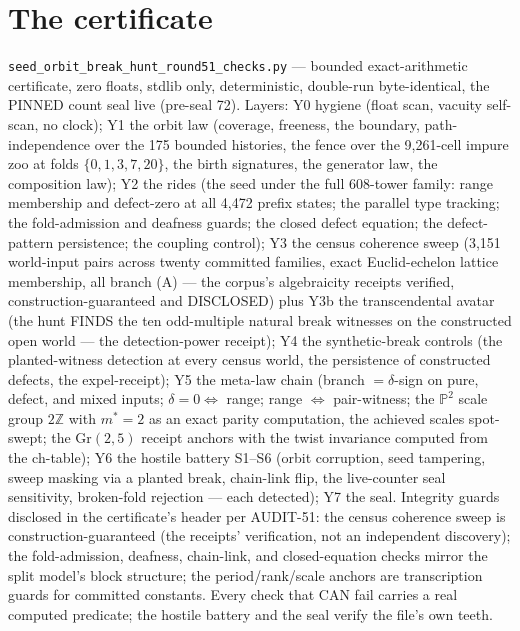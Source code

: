 \documentclass[11pt]{article}
\begin{document}
\section*{The certificate}

\texttt{seed\_orbit\_break\_hunt\_round51\_checks.py} --- bounded exact-arithmetic certificate, zero floats, stdlib only, deterministic, double-run byte-identical, the PINNED count seal live (pre-seal 72). Layers: Y0 hygiene (float scan, vacuity self-scan, no clock); Y1 the orbit law (coverage, freeness, the boundary, path-independence over the 175 bounded histories, the fence over the 9{,}261-cell impure zoo at folds $\{0,1,3,7,20\}$, the birth signatures, the generator law, the composition law); Y2 the rides (the seed under the full 608-tower family: range membership and defect-zero at all 4{,}472 prefix states; the parallel type tracking; the fold-admission and deafness guards; the closed defect equation; the defect-pattern persistence; the coupling control); Y3 the census coherence sweep (3{,}151 world-input pairs across twenty committed families, exact Euclid-echelon lattice membership, all branch (A) --- the corpus's algebraicity receipts verified, construction-guaranteed and DISCLOSED) plus Y3b the transcendental avatar (the hunt FINDS the ten odd-multiple natural break witnesses on the constructed open world --- the detection-power receipt); Y4 the synthetic-break controls (the planted-witness detection at every census world, the persistence of constructed defects, the expel-receipt); Y5 the meta-law chain (branch $=\delta$-sign on pure, defect, and mixed inputs; $\delta=0\iff$ range; range $\iff$ pair-witness; the $\mathbb P^2$ scale group $2\mathbb Z$ with $m^*=2$ as an exact parity computation, the achieved scales spot-swept; the $\mathrm{Gr}(2,5)$ receipt anchors with the twist invariance computed from the ch-table); Y6 the hostile battery S1--S6 (orbit corruption, seed tampering, sweep masking via a planted break, chain-link flip, the live-counter seal sensitivity, broken-fold rejection --- each detected); Y7 the seal. Integrity guards disclosed in the certificate's header per AUDIT-51: the census coherence sweep is construction-guaranteed (the receipts' verification, not an independent discovery); the fold-admission, deafness, chain-link, and closed-equation checks mirror the split model's block structure; the period/rank/scale anchors are transcription guards for committed constants. Every check that CAN fail carries a real computed predicate; the hostile battery and the seal verify the file's own teeth.
\end{document}

